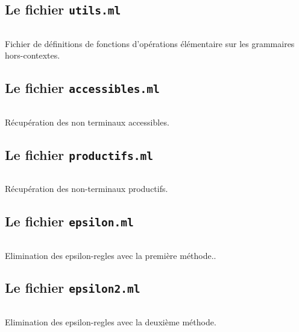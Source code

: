 \documentclass[11pt,a4paper]{article}
\def\code#1{\texttt{#1}} %
\begin{document}
\newpage

\subsection{Le fichier \code{utils.ml}}

    \inputminted{ocaml}{utils.ml}
    \caption{Fichier de définitions de fonctions d'opérations élémentaire sur les grammaires hors-contextes.}
\label{lst:long}


\newpage

\subsection{Le fichier \code{accessibles.ml}}

    \inputminted{ocaml}{accessibles.ml}
    \caption{Récupération des non terminaux accessibles.}
\label{lst:long}

\newpage

\subsection{Le fichier \code{productifs.ml}}

    \inputminted{ocaml}{productifs.ml}
    \caption{Récupération des non-terminaux productifs.}
\label{lst:long}

\newpage

\subsection{Le fichier \code{epsilon.ml}}

    \inputminted{ocaml}{epsilon.ml}
    \caption{Elimination des epsilon-regles avec la première méthode..}
\label{lst:long}

\newpage

\subsection{Le fichier \code{epsilon2.ml}}

    \inputminted{ocaml}{epsilon2.ml}
    \caption{Elimination des epsilon-regles avec la deuxième méthode.}
\label{lst:long}
\end{document}
